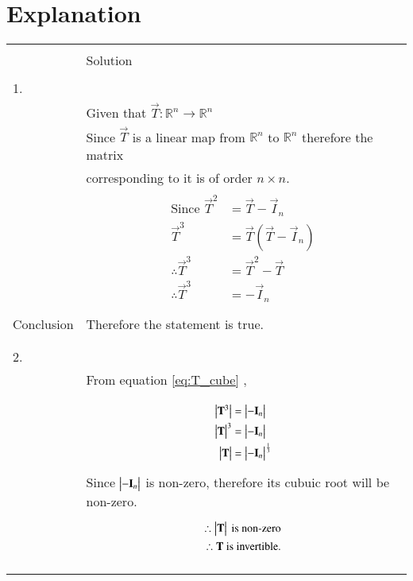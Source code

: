 \documentclass[journal,12pt]{IEEEtran}
\begin{document}
\section{\textbf{Explanation}}
\renewcommand{\thetable}{2}
\begin{longtable}{|l|l|}
\hline
\multirow{3}{*}{} & \\
Statement&Solution\\
\hline
&\\
1.&\\
&Given that $\vec{T}:\mathbb{R}^n \rightarrow \mathbb{R}^n$\\
&Since $\vec{T}$ is a linear map from $\mathbb{R}^n$ to $\mathbb{R}^n$ therefore the matrix\\
&corresponding to it is of order $n \times n$.\\
&\parbox{6cm}{\begin{align}
    \mbox{Since }\vec{T}^2&=\vec{T}-\vec{I}_{n}\\
    \vec{T}^3&=\vec{T}(\vec{T}-\vec{I}_{n})\\
    \therefore\vec{T}^3&=\vec{T}^2-\vec{T}\\
    \therefore \vec{T}^3&=-\vec{I}_{n}\label{eq:T_cube}
\end{align}}\\
\hline
&\\
Conclusion&Therefore the statement is true.\\
&\\
\hline
&\\
2.&\\
& From equation \eqref{eq:T_cube} ,\\
&\\
&\parbox{6cm}{\begin{align}
\begin{vmatrix}\mathbf{T}^3\end{vmatrix}&=\begin{vmatrix}-\mathbf{I}_{n}\end{vmatrix}\\
\begin{vmatrix}\mathbf{T}\end{vmatrix}^3&=\begin{vmatrix}-\mathbf{I}_{n}\end{vmatrix}\\
\begin{vmatrix}\mathbf{T}\end{vmatrix}&=\begin{vmatrix}-\mathbf{I}_{n}\end{vmatrix}^{\frac{1}{3}}
\end{align}}\\
&Since $\begin{vmatrix}-\mathbf{I}_{n}\end{vmatrix}$ is non-zero, therefore its cubuic root will be non-zero.\\
&\parbox{6cm}{\begin{align}
    \therefore\begin{vmatrix}\mathbf{T}\end{vmatrix}\mbox{ is non-zero}\label{eq:det_T}\\
    \therefore\mathbf{T}\mbox{ is invertible.}
\end{align}}\\
&\\
\hline
&\\

\end{longtable}
\end{document}
